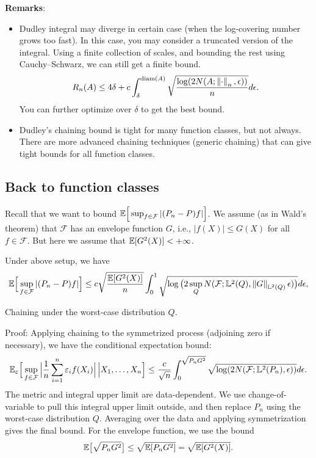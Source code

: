\documentclass[11pt,letterpaper]{article}
\numberwithin{theorem}{lecture}
\numberwithin{proposition}{lecture}
\numberwithin{lemma}{lecture}
\numberwithin{claim}{lecture}
\numberwithin{corollary}{lecture}
\numberwithin{definition}{lecture}
\numberwithin{conjecture}{lecture}
\numberwithin{remark}{lecture}
\numberwithin{example}{lecture}
\numberwithin{equation}{lecture}
\begin{document}
\bigskip
\noindent \textbf{Remarks}:
\begin{itemize}
  \item Dudley integral may diverge in certain case (when the log-covering number grows too fast). In this case, you may consider a truncated version of the integral. Using a finite collection of scales, and bounding the rest using Cauchy--Schwarz, we can still get a finite bound.
  \begin{align*}
    R_n (A) \leq 4\delta + c\int_\delta^{\mathrm{diam} (A)} \sqrt{\frac{\log (2N (A; \left\| \cdot\right\|_{n}, \epsilon))}{n}} d \epsilon.
  \end{align*}
  You can further optimize over $\delta$ to get the best bound.
  \item Dudley's chaining bound is tight for many function classes, but not always. There are more advanced chaining techniques (generic chaining) that can give tight bounds for all function classes.
\end{itemize}

\subsection{Back to function classes}
Recall that we want to bound ${\mathbb{E}} \Big[\sup_{f \in \mathcal{F}} |(P_n - P) f| \Big]$. We assume (as in Wald's theorem) that $\mathcal{F}$ has an envelope function $G$, i.e., $|f (X)| \leq G (X)$ for all $f \in \mathcal{F}$. But here we assume that ${\mathbb{E}} [G^2 (X)] < + \infty$.

\begin{theorem}
  Under above setup, we have
  \begin{align*}
    {\mathbb{E}} \Big[\sup_{f \in \mathcal{F}} |(P_n - P) f| \Big] \leq c \sqrt{\frac{{\mathbb{E}} [G^2 (X)]}{n}}\int_0^{1} \sqrt{\log \big(2\sup_{Q} N (\mathcal{F}; \mathbb{L}^2 (Q), \left\| G\right\|_{\mathbb{L}^2 (Q)} \epsilon)\big)} d \epsilon,
  \end{align*}
\end{theorem}
Chaining under the worst-case distribution $Q$.

Proof: Applying chaining to the symmetrized process (adjoining zero if necessary), we have the conditional expectation bound:
\begin{align*}
  {\mathbb{E}}_\varepsilon \Big[ \sup_{f \in \mathcal{F}} \Big|\frac1n\sum_{i=1}^n\varepsilon_i f(X_i)\Big| \,\Big| X_1, \ldots, X_n \Big] \leq \frac{c}{\sqrt{n}} \int_0^{\sqrt{P_n G^2}} \sqrt{\log (2N (\mathcal{F}; \mathbb{L}^2 (P_n), \epsilon))} d \epsilon.
\end{align*}
The metric and integral upper limit are data-dependent. We use change-of-variable to pull this integral upper limit outside, and then replace $P_n$ using the worst-case distribution $Q$. Averaging over the data and applying symmetrization gives the final bound. For the envelope function, we use the bound
\begin{align*}
  {\mathbb{E}} \big[ \sqrt{P_n G^2} \big] \leq \sqrt{{\mathbb{E}} [P_n G^2]} = \sqrt{{\mathbb{E}} [G^2 (X)]}.
\end{align*}
\end{document}
